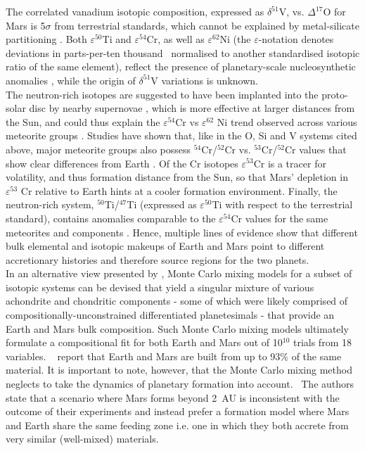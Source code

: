 \documentclass[preprint,5p,times,authoryear]{elsarticle}
\begin{document}
The correlated vanadium isotopic composition, expressed as $\delta ^{51}$V, vs. $\Delta ^{17}$O for Mars is 5$\sigma$ from terrestrial 
standards, which cannot be explained by metal-silicate partitioning \citep{N14}. Both $\varepsilon ^{50}$Ti and $\varepsilon ^{54}$Cr, 
as well as $\varepsilon ^{62}$Ni (the $\varepsilon$-notation denotes deviations in parts-per-ten thousand {\ normalised to 
another standardised isotopic ratio of the same element}), reflect the presence of planetary-scale nucleosynthetic anomalies 
\citep{War11,TD14}, while the origin of $\delta ^{51}$V variations is unknown.\\

The neutron-rich isotopes are suggested to have been implanted into the proto-solar disc by nearby supernovae \citep{Q10}, which is 
more effective at larger distances from the Sun, and could thus explain the $\varepsilon ^{54}$Cr vs $\varepsilon ^{62}$ Ni trend 
observed across various meteorite groups \citep{War11}. Studies have shown that, like in the O, Si and V systems cited above, major 
meteorite groups also possess $^{54}$Cr/$^{52}$Cr vs. $^{53}$Cr/$^{52}$Cr values that show clear differences from Earth 
\citep{T07,T08,Q10}. Of the Cr isotopes $\varepsilon^{53}$Cr is a tracer for volatility, and thus formation distance from the 
Sun, so that Mars' depletion in $\varepsilon ^{53}$ Cr relative to Earth hints at a cooler formation environment. Finally, the 
neutron-rich system, $^{50}$Ti/$^{47}$Ti (expressed as $\varepsilon ^{50}$Ti with respect to the terrestrial standard), contains 
anomalies comparable to the $\varepsilon ^{54}$Cr values for the same meteorites and components \citep{T09}. Hence, multiple lines 
of evidence show that different bulk elemental and isotopic makeups of Earth and Mars point to different accretionary histories and 
therefore source regions for the two planets.\\

In an alternative view presented by \citet{FB16}, Monte Carlo mixing models for a subset of isotopic systems can be devised that yield 
a singular mixture of various achondrite and chondritic components - some of which were likely comprised of 
compositionally-unconstrained differentiated planetesimals - that provide an Earth and Mars bulk composition. Such Monte Carlo 
mixing models ultimately formulate a compositional fit for both Earth and Mars out of 10$^{10}$ trials from 18 variables. 
{\ \citet{FB16} report that Earth and Mars are built from up to 93\% of the same material.} It is important to note, however, that 
the Monte Carlo mixing method neglects to take the dynamics of planetary formation into account. {\ The authors state that a 
scenario where Mars forms beyond 2~AU is inconsistent with the outcome of their experiments and instead prefer a formation model where 
Mars and Earth share the same feeding zone i.e. one in which they both accrete from very similar (well-mixed) materials}.\\
\end{document}
